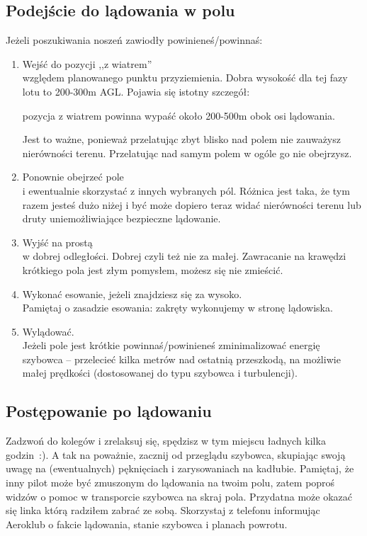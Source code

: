 \documentclass{article}
\begin{document}
\subsection{Podejście do lądowania w polu}
Jeżeli poszukiwania noszeń zawiodły powinieneś/powinnaś:
\begin{enumerate}
\item Wejść do pozycji ,,z wiatrem'' \\
    względem planowanego punktu przyziemienia.
    Dobra wysokość dla tej fazy lotu to
    200-300m AGL. Pojawia się istotny szczegół: \begin{bf}pozycja z
    wiatrem powinna wypaść około 200-500m obok osi lądowania.\end{bf}
    Jest to ważne, ponieważ przelatując zbyt blisko nad polem nie
    zauważysz nierówności terenu. Przelatując nad samym polem w ogóle
    go nie obejrzysz. 

\item Ponownie obejrzeć pole\\
    i ewentualnie skorzystać z innych wybranych pól. Różnica jest taka,
    że tym razem jesteś dużo niżej i być może dopiero
    teraz widać nierówności terenu lub druty uniemożliwiające bezpieczne
    lądowanie.

\item Wyjść na prostą\\
    w dobrej odległości. Dobrej czyli też nie za małej. Zawracanie na
    krawędzi krótkiego pola jest złym pomysłem, możesz się nie zmieścić.

\item Wykonać esowanie, jeżeli znajdziesz się za wysoko.\\
    Pamiętaj o zasadzie esowania: zakręty wykonujemy w stronę
    lądowiska.

\item Wylądować.\\
    Jeżeli pole jest krótkie powinnaś/powinieneś zminimalizować energię
    szybowca -- 
    przelecieć kilka metrów nad ostatnią przeszkodą, na możliwie małej
    prędkości (dostosowanej do typu szybowca i turbulencji).

\end{enumerate}

\subsection{Postępowanie po lądowaniu}
Zadzwoń do kolegów i zrelaksuj się, spędzisz w tym miejscu ładnych
kilka godzin~:).
A tak na poważnie, zacznij od przeglądu szybowca, skupiając swoją
uwagę na (ewentualnych) pęknięciach i zarysowaniach na kadłubie.
Pamiętaj, że inny pilot może być zmuszonym do lądowania na twoim polu, zatem
poproś widzów o pomoc w transporcie szybowca na skraj pola. Przydatna
może okazać się linka którą radziłem zabrać ze sobą. Skorzystaj z
telefonu informując Aeroklub o fakcie lądowania, stanie szybowca i planach
powrotu.
\end{document}
